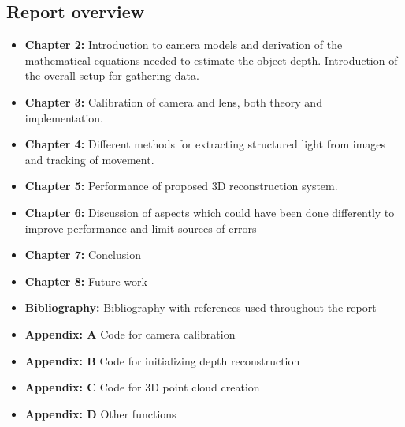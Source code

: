 \subsection{Report overview}
\begin{itemize}
    \item \textbf{Chapter 2:} Introduction to camera models and derivation of the mathematical equations needed to estimate the object depth. Introduction of the overall setup for gathering data.
    \item \textbf{Chapter 3:} Calibration of camera and lens, both theory and implementation. 
    \item \textbf{Chapter 4:} Different methods for extracting structured light from images and tracking of movement.
    \item \textbf{Chapter 5:} Performance of proposed 3D reconstruction system.
    \item \textbf{Chapter 6:} Discussion of aspects which could have been done differently to improve performance and limit sources of errors
    \item \textbf{Chapter 7:} Conclusion
    \item \textbf{Chapter 8:} Future work 
    \item \textbf{Bibliography:} Bibliography with references used throughout the report
    \item \textbf{Appendix: A} Code for camera calibration
    \item \textbf{Appendix: B} Code for initializing depth reconstruction
    \item \textbf{Appendix: C} Code for 3D point cloud creation
    \item \textbf{Appendix: D} Other functions
\end{itemize}


